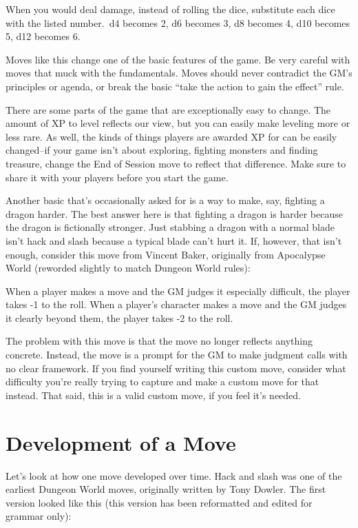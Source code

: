 When you would deal damage, instead of rolling the dice, substitute each dice with the listed number.\ d4 becomes 2, d6 becomes 3, d8 becomes 4, d10 becomes 5, d12 becomes 6.


Moves like this change one of the basic features of the game. Be very careful with moves that muck with the fundamentals. Moves should never contradict the GM's principles or agenda, or break the basic ``take the action to gain the effect'' rule.


There are some parts of the game that are exceptionally easy to change. The amount of XP to level reflects our view, but you can easily make leveling more or less rare. As well, the kinds of things players are awarded XP for can be easily changed--if your game isn't about exploring, fighting monsters and finding treasure, change the End of Session move to reflect that difference. Make sure to share it with your players before you start the game.


Another basic that's occasionally asked for is a way to make, say, fighting a dragon harder. The best answer here is that fighting a dragon is harder because the dragon is fictionally stronger. Just stabbing a dragon with a normal blade isn't hack and slash because a typical blade can't hurt it. If, however, that isn't enough, consider this move from Vincent Baker, originally from Apocalypse World (reworded slightly to match Dungeon World rules):


When a player makes a move and the GM judges it especially difficult, the player takes -1 to the roll. When a player's character makes a move and the GM judges it clearly beyond them, the player takes -2 to the roll.


The problem with this move is that the move no longer reflects anything concrete. Instead, the move is a prompt for the GM to make judgment calls with no clear framework. If you find yourself writing this custom move, consider what difficulty you're really trying to capture and make a custom move for that instead. That said, this is a valid custom move, if you feel it's needed.
\section*{Development of a Move}


Let's look at how one move developed over time. Hack and slash was one of the earliest Dungeon World moves, originally written by Tony Dowler. The first version looked like this (this version has been reformatted and edited for grammar only):


